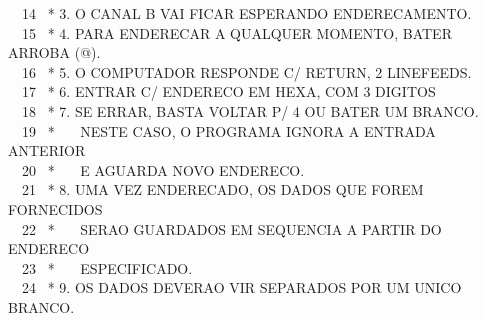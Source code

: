 \documentclass[a4paper,12pt]{article}
\begin{document}
\phantom \ \ 14 \ * 3. O CANAL B VAI FICAR ESPERANDO ENDERECAMENTO.\\
\phantom \ \ 15 \ * 4. PARA ENDERECAR A QUALQUER MOMENTO, BATER ARROBA (@).\\
\phantom \ \ 16 \ * 5. O COMPUTADOR RESPONDE C/ RETURN, 2 LINEFEEDS.\\
\phantom \ \ 17 \ * 6. ENTRAR C/ ENDERECO EM HEXA, COM 3 DIGITOS\\
\phantom \ \ 18 \ * 7. SE ERRAR, BASTA VOLTAR P/ 4 OU BATER UM BRANCO.\\
\phantom \ \ 19 \ * \ \ \ NESTE CASO, O PROGRAMA IGNORA A ENTRADA ANTERIOR\\
\phantom \ \ 20 \ * \ \ \ E AGUARDA NOVO ENDERECO.\\
\phantom \ \ 21 \ * 8. UMA VEZ ENDERECADO, OS DADOS QUE FOREM FORNECIDOS\\
\phantom \ \ 22 \ * \ \ \ SERAO GUARDADOS EM SEQUENCIA A PARTIR DO ENDERECO\\
\phantom \ \ 23 \ * \ \ \ ESPECIFICADO.\\
\phantom \ \ 24 \ * 9. OS DADOS DEVERAO VIR SEPARADOS POR UM UNICO BRANCO.

\newpage
\end{document}
